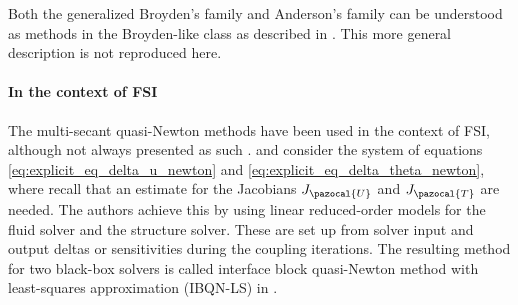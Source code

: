 Both the generalized Broyden's family and Anderson's family can be understood as methods in the Broyden-like class as described in \cite{fang_two_2009}.
This more general description is not reproduced here.




\paragraph{In the context of FSI}

The multi-secant quasi-Newton methods have been used in the context of FSI, although not always presented as such \citep{haelterman_quasi-newton_2009, gatzhammer_efficient_2014, uekermann_partitioned_2016, scheufele_coupling_2018}.
 \cite{vierendeels_implicit_2007} and \cite{degroote_stability_2008} consider the system of equations \eqref{eq:explicit_eq_delta_u_newton} and \eqref{eq:explicit_eq_delta_theta_newton}, where recall that an estimate for the Jacobians \(J_\pazocal{U}\) and \(J_\pazocal{T}\) are needed.
The authors achieve this by using linear reduced-order models for the fluid solver and the structure solver.
These are set up from solver input and output deltas or sensitivities during the coupling iterations.
The resulting method for two black-box solvers is called interface block quasi-Newton method with least-squares approximation (IBQN-LS) in \cite{degroote_development_2010}.

